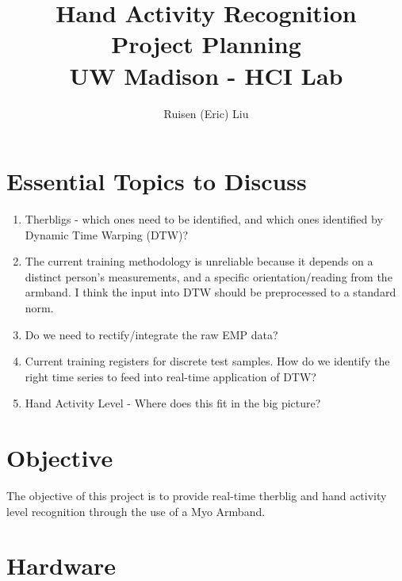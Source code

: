 \documentclass[12pt]{article}
\title{ Hand Activity Recognition \\ Project Planning \\ UW Madison - HCI Lab }
\author{Ruisen (Eric) Liu}
\begin{document}
\vspace*{5cm}
{\let\newpage\relax\maketitle}

\pagebreak

\tableofcontents


\newpage

\section{Essential Topics to Discuss}

\begin{enumerate}

\item Therbligs - which ones need to be identified, and which ones identified by Dynamic Time Warping (DTW)?

\item The current training methodology is unreliable because it depends on a distinct person's measurements, and a specific orientation/reading from the armband. I think the input into DTW should be preprocessed to a standard norm.  

\item Do we need to rectify/integrate the raw EMP data? 

\item Current training registers for discrete test samples. How do we identify the right time series to feed into real-time application of DTW?

\item Hand Activity Level - Where does this fit in the big picture?


\end{enumerate}


\section{Objective}


The objective of this project is to provide real-time therblig and hand activity level recognition through the use of a Myo Armband.


\section{Hardware}
\end{document}

